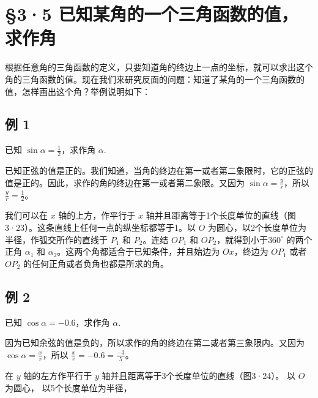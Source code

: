 \section{§3·5 已知某角的一个三角函数的值， 求作角}

根据任意角的三角函数的定义，只要知道角的终边上一点的坐标，就可以求出这个角的三角函数的值。现在我们来研究反面的问题：知道了某角的一个三角函数的值，怎样画出这个角？举例说明如下：

\subsection{例 1}

已知 \(\sin \alpha = \frac{1}{2}\)，求作角 \(\alpha\).

已知正弦的值是正的。我们知道，当角的终边在第一或者第二象限时，它的正弦的值是正的。因此，求作的角的终边在第一或者第二象限。又因为
\(\sin \alpha = \frac{y}{r}\)，所以 \(\frac{y}{r} = \frac{1}{2}\)。

我们可以在 \(x\) 轴的上方，作平行于 \(x\)
轴并且距离等于1个长度单位的直线（图3·23）。这条直线上任何一点的纵坐标都等于1。以
\(O\) 为圆心，以2个长度单位为半径，作弧交所作的直线于 \(P_{1}\) 和
\(P_{2}\)。连结 \(OP_{1}\) 和 \(OP_{2}\)，就得到小于\(360^{\circ}\)
的两个正角 \(\alpha_{1}\) 和
\(\alpha_{2}\)。这两个角都适合于已知条件，并且始边为 \(Ox\)，终边为
\(OP_{1}\) 或者 \(OP_{2}\) 的任何正角或者负角也都是所求的角。

\subsection{例 2}

已知 \(\cos \alpha = -0.6\)，求作角 \(\alpha\).

因为已知余弦的值是负的，所以求作的角的终边在第二或者第三象限内。又因为
\(\cos \alpha = \frac{x}{r}\)，所以
\(\frac{x}{r} = -0.6 = \frac{-3}{5}\)。

在 \(y\) 轴的左方作平行于 \(y\)
轴并且距离等于3个长度单位的直线（图3·24）。 以 \(O\) 为圆心，
以5个长度单位为半径，

